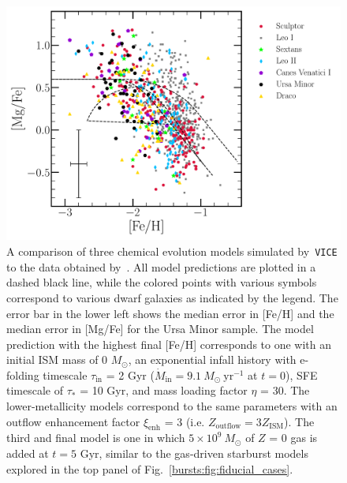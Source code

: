 \documentclass[main.tex]{subfiles}
\begin{document}
\begin{figure} %
\centering
\includegraphics[scale = 0.45]{./chapter2/kirby2010.pdf} 
\caption{
A comparison of three chemical evolution models simulated by~\texttt{VICE} to 
the data obtained by~\citet{Kirby2010}. All model predictions are plotted in a 
dashed black line, while the colored points with various symbols correspond to 
various dwarf galaxies as indicated by the legend. The error bar in the lower 
left shows the median error in [Fe/H] and the median error in [Mg/Fe] for the 
Ursa Minor sample. The model prediction with the highest final [Fe/H] 
corresponds to one with an initial ISM mass of 0 $M_\odot$, an exponential 
infall history with e-folding timescale $\tau_\text{in}$ = 2 Gyr 
($\dot{M}_\text{in} = 9.1\ M_\odot\ \text{yr}^{-1}$ at $t = 0$), SFE 
timescale of $\tau_*$ = 10 Gyr, and mass loading factor $\eta$ = 30. The 
lower-metallicity models correspond to the same parameters with an outflow 
enhancement factor $\xi_\text{enh}$ = 3 (i.e. $Z_\text{outflow} = 
3Z_\text{ISM}$). The third and final model is one in which $5\times10^9\ 
M_\odot$ of $Z$ = 0 gas is added at $t = 5$ Gyr, similar to the gas-driven 
starburst models explored in the top panel of Fig.~\ref{bursts:fig:fiducial_cases}. 
}
\label{bursts:fig:kirby2010} 
\end{figure} 
\end{document}
